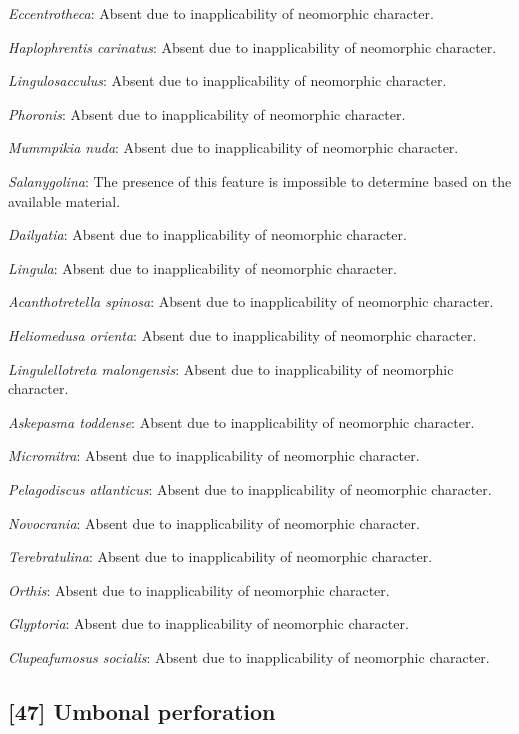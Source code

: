 \documentclass[openany]{book}
\theoremstyle{definition}
\theoremstyle{definition}
\theoremstyle{definition}
\theoremstyle{remark}
\begin{document}
\emph{Eccentrotheca}: Absent due to inapplicability of neomorphic
character.

\emph{Haplophrentis carinatus}: Absent due to inapplicability of
neomorphic character.

\emph{Lingulosacculus}: Absent due to inapplicability of neomorphic
character.

\emph{Phoronis}: Absent due to inapplicability of neomorphic character.

\emph{Mummpikia nuda}: Absent due to inapplicability of neomorphic
character.

\emph{Salanygolina}: The presence of this feature is impossible to
determine based on the available material.

\emph{Dailyatia}: Absent due to inapplicability of neomorphic character.

\emph{Lingula}: Absent due to inapplicability of neomorphic character.

\emph{Acanthotretella spinosa}: Absent due to inapplicability of
neomorphic character.

\emph{Heliomedusa orienta}: Absent due to inapplicability of neomorphic
character.

\emph{Lingulellotreta malongensis}: Absent due to inapplicability of
neomorphic character.

\emph{Askepasma toddense}: Absent due to inapplicability of neomorphic
character.

\emph{Micromitra}: Absent due to inapplicability of neomorphic
character.

\emph{Pelagodiscus atlanticus}: Absent due to inapplicability of
neomorphic character.

\emph{Novocrania}: Absent due to inapplicability of neomorphic
character.

\emph{Terebratulina}: Absent due to inapplicability of neomorphic
character.

\emph{Orthis}: Absent due to inapplicability of neomorphic character.

\emph{Glyptoria}: Absent due to inapplicability of neomorphic character.

\emph{Clupeafumosus socialis}: Absent due to inapplicability of
neomorphic character.

\hypertarget{umbonal-perforation}{%
\subsection*{{[}47{]} Umbonal perforation}\label{umbonal-perforation}}
\end{document}
